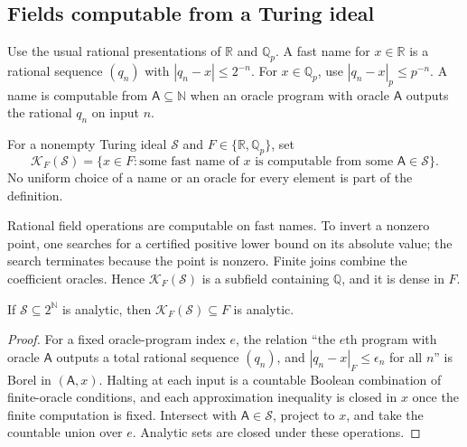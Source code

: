 \documentclass[11pt]{article}
\theoremstyle{definition}
\theoremstyle{remark}
\newcommand{\R}{\mathbb{R}}
\newcommand{\N}{\mathbb{N}}
\newcommand{\Q}{\mathbb{Q}}
\newcommand{\Qp}{\mathbb{Q}_p}
\begin{document}
\subsection{Fields computable from a Turing ideal}\label{isg:ptg:sec:fields}
Use the usual rational presentations of $\R$ and $\Qp$. A fast name for
$x\in\R$ is a rational sequence $(q_n)$ with $|q_n-x|\leq2^{-n}$. For
$x\in\Qp$, use $|q_n-x|_p\leq p^{-n}$. A name is computable from
$\mathsf A\subseteq\N$ when an oracle program with oracle $\mathsf A$
outputs the rational $q_n$ on input $n$.

\begin{definition}\label{isg:ptg:def:field}
For a nonempty Turing ideal $\mathcal S$ and $F\in\{\R,\Qp\}$, set
\[
 \mathcal K_F(\mathcal S)=\{x\in F:\text{some fast name of }x
                   \text{ is computable from some }\mathsf A\in\mathcal S\}.
\]
No uniform choice of a name or an oracle for every element is part of the
definition.
\end{definition}

Rational field operations are computable on fast names. To invert a
nonzero point, one searches for a certified positive lower bound on its
absolute value; the search terminates because the point is nonzero. Finite
joins combine the coefficient oracles. Hence $\mathcal K_F(\mathcal S)$ is
a subfield containing $\Q$, and it is dense in $F$.

\begin{lemma}\label{isg:ptg:lem:analyticfield}
If $\mathcal S\subseteq2^\N$ is analytic, then
$\mathcal K_F(\mathcal S)\subseteq F$ is analytic.
\end{lemma}
\begin{proof}
For a fixed oracle-program index $e$, the relation ``the $e$th program with
oracle $\mathsf A$ outputs a total rational sequence $(q_n)$, and
$|q_n-x|_F\leq\epsilon_n$ for all $n$'' is Borel in $(\mathsf A,x)$.
Halting at each input is a countable Boolean combination of finite-oracle
conditions, and each approximation inequality is closed in $x$ once the
finite computation is fixed. Intersect with $\mathsf A\in\mathcal S$,
project to $x$, and take the countable union over $e$. Analytic sets are
closed under these operations.
\end{proof}
\end{document}
